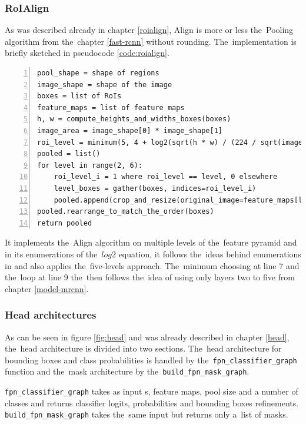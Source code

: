 \subsubsection{RoIAlign}
\label{model-roi}

As was described already in chapter \ref{roialign}, Align is more or 
less the~Pooling algorithm from the~chapter \ref{fast-rcnn} without 
rounding. The~implementation is briefly sketched in pseudocode 
\ref{code:roialign}.

{\scriptsize
\begin{lstlisting}[style=python, caption={RoIAlign}, captionpos=b, 
label=code:roialign, deletekeywords={from, input, map},
backgroundcolor = \color{light-gray}, numbers=left, breaklines=true]
pool_shape = shape of regions
image_shape = shape of the image
boxes = list of RoIs
feature_maps = list of feature maps
h, w = compute_heights_and_widths_boxes(boxes)
image_area = image_shape[0] * image_shape[1]
roi_level = minimum(5, 4 + log2(sqrt(h * w) / (224 / sqrt(image_area))))
pooled = list()
for level in range(2, 6):
    roi_level_i = 1 where roi_level == level, 0 elsewhere
    level_boxes = gather(boxes, indices=roi_level_i)
    pooled.append(crop_and_resize(original_image=feature_maps[level-2], what_process=level_boxes, shape=pool_shape, method='bilinear'))
pooled.rearrange_to_match_the_order(boxes)
return pooled
\end{lstlisting}}

It implements the~Align algorithm on multiple levels of the~feature 
pyramid and in its enumerations of the~$log2$ equation, it follows the~ideas 
behind enumerations in \cite{fpn} and also applies the~five-levels approach.
The~minimum choosing at line 7 and the~loop at line 9 the~then follows the~idea of 
using only layers two to five from chapter \ref{model-mrcnn}.

\subsubsection{Head architectures}
\label{model-head}

As can be seen in figure \ref{fig:head} and was already described in chapter 
\ref{head}, the~head architecture is divided into two sections. The~head 
architecture for bounding boxes and class probabilities is handled by
the~\verb|fpn_classifier_graph| function and the~mask architecture by
the~\verb|build_fpn_mask_graph|.

\verb|fpn_classifier_graph| takes as input s, feature maps, pool size 
and a number of classes and returns classifier logits, probabilities and bounding 
boxes refinements. \verb|build_fpn_mask_graph| takes the~same input but returns 
only a~list of masks.

